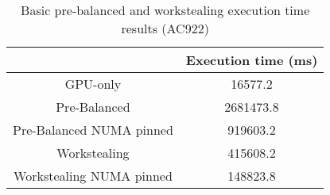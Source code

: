 \begin{table}[H]
  \centering
  \begin{tabular}{||c | c||} 
   \hline
    & Execution time (ms) \\ [0.5ex] 
   \hline\hline
   GPU-only & 16577.2 \\
   Pre-Balanced & 2681473.8 \\ 
   Pre-Balanced NUMA pinned & 919603.2 \\
   Workstealing & 415608.2 \\
   Workstealing NUMA pinned & 148823.8 \\ [1ex] 
   \hline
  \end{tabular}
  \caption{Basic pre-balanced and workstealing execution time results (AC922)}
  \label{table:bench_ac922}
\end{table}